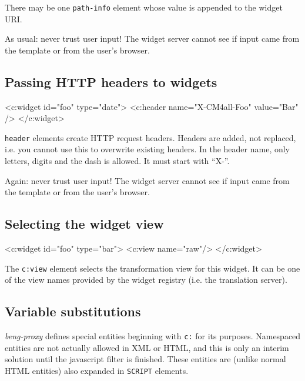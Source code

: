 \documentclass[a4paper,12pt]{article}
\begin{document}
There may be one \texttt{path-info} element whose value is appended to
the widget URI.

As usual: never trust user input!  The widget server cannot see if
input came from the template or from the user's browser.

\subsection{Passing HTTP headers to widgets}

\begin{verbatim*}
<c:widget id="foo" type="date">
  <c:header name="X-CM4all-Foo" value="Bar" />
</c:widget>
\end{verbatim*}

\texttt{header} elements create HTTP request headers.  Headers are
added, not replaced, i.e. you cannot use this to overwrite existing
headers.  In the header name, only letters, digits and the dash is
allowed.  It must start with ``X-''.

Again: never trust user input!  The widget server cannot see if input
came from the template or from the user's browser.

\subsection{Selecting the widget view}

\begin{verbatim*}
<c:widget id="foo" type="bar">
  <c:view name="raw"/>
</c:widget>
\end{verbatim*}

The \texttt{c:view} element selects the transformation view for this
widget.  It can be one of the view names provided by the widget
registry (i.e. the translation server).

\subsection{Variable substitutions}

\emph{beng-proxy} defines special entities beginning with \texttt{c:}
for its purposes.  Namespaced entities are not actually allowed in XML
or HTML, and this is only an interim solution until the javascript
filter is finished.  These entities are (unlike normal HTML entities)
also expanded in \texttt{SCRIPT} elements.
\end{document}
